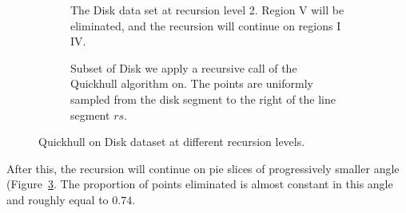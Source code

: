\begin{figure}[ht]
    \begin{subfigure}{0.4\textwidth}
        \caption{The Disk data set at recursion level 2. Region V will be 
                 eliminated, and the recursion will continue on regions I 
                 \textemdash IV.}
        \label{fig:disk_level2}
    \end{subfigure}
    \hfill
    \begin{subfigure}{0.4\textwidth}
        \caption{Subset of Disk we apply a recursive call of the Quickhull 
                 algorithm on. The points are uniformly sampled from the disk
                 segment to the right of the line segment $rs$.}
        \label{fig:disk_level3+}
    \end{subfigure}
    \caption{Quickhull on Disk dataset at different recursion levels.}
\end{figure}

After this, the recursion will continue on pie slices of progressively smaller
angle (Figure~\ref{fig:disk_level3+}. 
The proportion of points eliminated is almost constant in this angle and roughly
equal to $0.74$.

